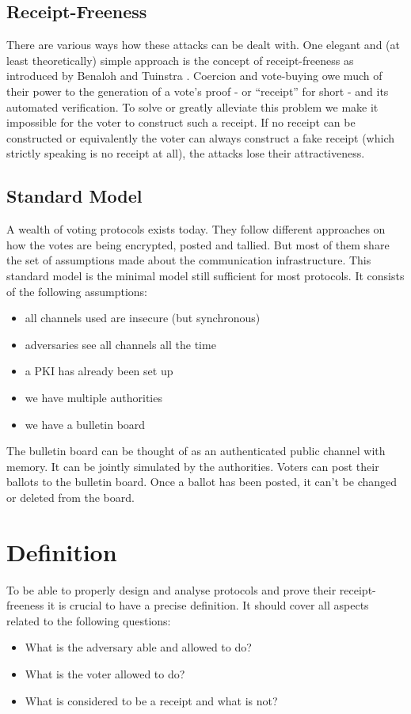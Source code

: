 \documentclass{article}
\begin{document}
\subsection{Receipt-Freeness}
There are various ways how these attacks can be dealt with. One elegant and (at least theoretically) simple approach is the concept of receipt-freeness as introduced by Benaloh and Tuinstra \cite{BenTui94}. Coercion and vote-buying owe much of their power to the generation of a vote's proof - or ``receipt'' for short - and its automated verification. To solve or greatly alleviate this problem we make it impossible for the voter to construct such a receipt.
If no receipt can be constructed or equivalently the voter can always construct a fake receipt (which strictly speaking is no receipt at all), the attacks lose their attractiveness.


\subsection{Standard Model}
A wealth of voting protocols exists today. They follow different approaches on how the votes are being encrypted, posted and tallied. But most of them share the set of assumptions made about the communication infrastructure.
This standard model is the minimal model still sufficient for most protocols. It consists of the following assumptions:
\begin{itemize}
  \item all channels used are insecure (but synchronous)
  \item adversaries see all channels all the time
  \item a PKI has already been set up
  \item we have multiple authorities
  \item we have a bulletin board
\end{itemize}

The bulletin board can be thought of as an authenticated public channel with memory. It can be jointly simulated by the authorities. Voters can post their ballots to the bulletin board. Once a ballot has been posted, it can't be changed or deleted from the board.



\section{Definition}
To be able to properly design and analyse protocols and prove their receipt-freeness it is crucial to have a precise definition. It should cover all aspects related to the following questions:
\begin{itemize}
  \item What is the adversary able and allowed to do?
  \item What is the voter allowed to do?
  \item What is considered to be a receipt and what is not?
\end{itemize}
\end{document}
